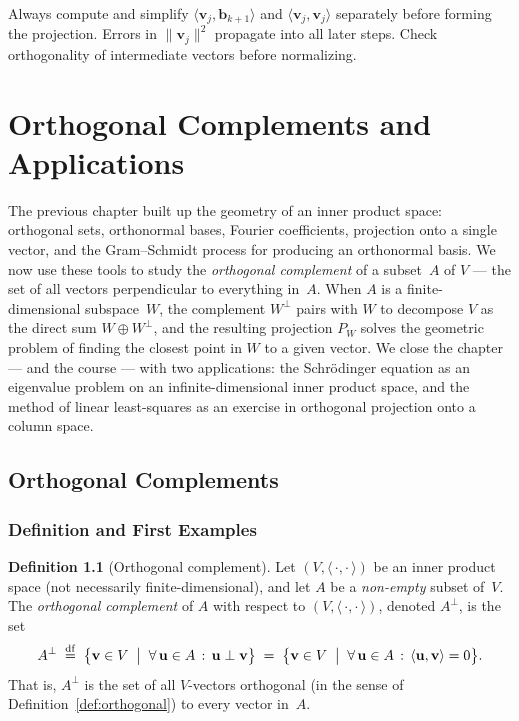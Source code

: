 \documentclass[11pt, a4paper, notitlepage]{report}
\theoremstyle{definition}
\newtheorem{definition}[theorem]{Definition}
\theoremstyle{remark}
\begin{document}
\begin{examtip}[title={Exam Tip: Gram--Schmidt Workflow}]
Always compute and simplify $\langle\mathbf{v}_j,\mathbf{b}_{k+1}\rangle$ and
$\langle\mathbf{v}_j,\mathbf{v}_j\rangle$ separately before forming the projection.
Errors in $\|\mathbf{v}_j\|^2$ propagate into all later steps.
Check orthogonality of intermediate vectors before normalizing.
\end{examtip}

\chapter{Orthogonal Complements and Applications}
\label{chap:week12}

The previous chapter built up the geometry of an inner product space:
orthogonal sets, orthonormal bases, Fourier coefficients, projection
onto a single vector, and the Gram--Schmidt process for producing an
orthonormal basis. We now use these tools to study the
\emph{orthogonal complement} of a subset~$A$ of $V$ --- the set of all
vectors perpendicular to everything in~$A$. When $A$ is a finite-dimensional
subspace~$W$, the complement $W^\perp$ pairs with $W$ to decompose $V$
as the direct sum $W\oplus W^\perp$, and the resulting projection $P_W$
solves the geometric problem of finding the closest point in $W$ to a
given vector. We close the chapter --- and the course --- with two
applications: the Schr\"odinger equation as an eigenvalue problem on an
infinite-dimensional inner product space, and the method of linear
least-squares as an exercise in orthogonal projection onto a column space.

\section{Orthogonal Complements}
\label{sec:orth-complement}

\subsection{Definition and First Examples}
\label{subsec:orth-comp-def}

\begin{definition}[Orthogonal complement]
\label{def:orth-complement}
Let $(V,\langle\,\cdot,\cdot\,\rangle)$ be an inner product space (not
necessarily finite-dimensional), and let $A$ be a \emph{non-empty} subset
of~$V$. The \emph{orthogonal complement} of $A$ with respect to
$(V,\langle\,\cdot,\cdot\,\rangle)$, denoted $A^\perp$, is the set
\[
  A^\perp \;\stackrel{\mathrm{df}}{=}\; \bigl\{\mathbf{v}\in V \;\bigm|\;
    \forall\,\mathbf{u}\in A\,:\, \mathbf{u}\perp\mathbf{v}\bigr\}
  \;=\; \bigl\{\mathbf{v}\in V \;\bigm|\;
    \forall\,\mathbf{u}\in A\,:\, \langle\mathbf{u},\mathbf{v}\rangle = 0\bigr\}.
\]
That is, $A^\perp$ is the set of all $V$-vectors orthogonal (in the sense of
Definition~\ref{def:orthogonal}) to every vector in~$A$.
\end{definition}
\end{document}

